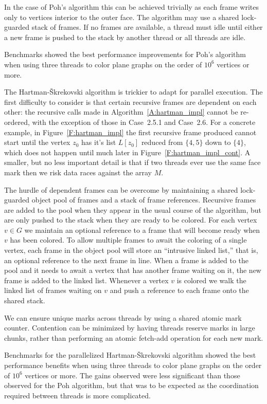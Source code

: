 \documentclass[12pt,letterpaper]{article}
\theoremstyle{plain}
\theoremstyle{definition}
\theoremstyle{break}
\begin{document}
In the case of Poh's algorithm this can be achieved trivially as each
frame writes only to vertices interior to the outer face. The
algorithm may use a shared lock-guarded stack of frames.
If no frames are
available, a thread must idle until either a new frame is pushed to the stack
by another thread or
all threads are idle.

Benchmarks showed the best performance improvements for Poh's algorithm when
using three threads to color plane graphs on the order of $10^6$ vertices
or more. 

The Hartman-\v{S}krekovski algorithm is trickier to adapt for
parallel execution. The first difficulty to consider is that certain recursive
frames are
dependent on each other: the recursive calls made in
Algorithm~\ref{A:hartman_impl} cannot be re-ordered, with the exception of
those in Case~2.5.1 and Case~2.6. For a concrete example,
in Figure~\ref{F:hartman_impl} the first recursive
frame produced cannot start until the vertex $z_0$ has it's list $L[z_0]$
reduced from $\{4,5\}$ down to $\{4\}$, which does not happen
until much later in Figure~\ref{F:hartman_impl_cont}. A smaller, but no less important detail is that
if two threads ever use the
same face mark then we risk data races against the array $M$.

The hurdle of dependent frames can be overcome by maintaining a shared
lock-guarded object pool
of frames and a stack of frame references. Recursive frames are added to the
pool when they appear in the usual course of the algorithm, but
are only pushed to the stack when they
are ready to be colored. For each vertex $v\in G$ we maintain an optional reference
to a frame that will become ready when $v$ has been colored. To allow
multiple frames to await the coloring of a single vertex, each frame in the
object pool will store an ``intrusive linked list,'' that is, an optional
reference to the next frame in line. When a frame is added to the pool and
it needs to await a vertex that has another frame waiting on it,
the new frame is added to the linked list.
Whenever a vertex $v$ is
colored we walk the linked list of frames waiting on $v$
and push a reference to each frame onto the shared stack.

We can ensure unique marks across threads by using a shared atomic mark
counter.
Contention can be minimized by having
threads reserve marks in large chunks, rather than performing an
atomic fetch-add operation for each new mark.

Benchmarks for the parallelized Hartman-\v{S}krekovski algorithm showed
the best performance
benefits when using three threads to color plane graphs on the order
of $10^6$ vertices or more.
The gains observed were less significant than those observed for the
Poh algorithm, but that was to be expected as the coordination required
between threads is more complicated.
\end{document}

